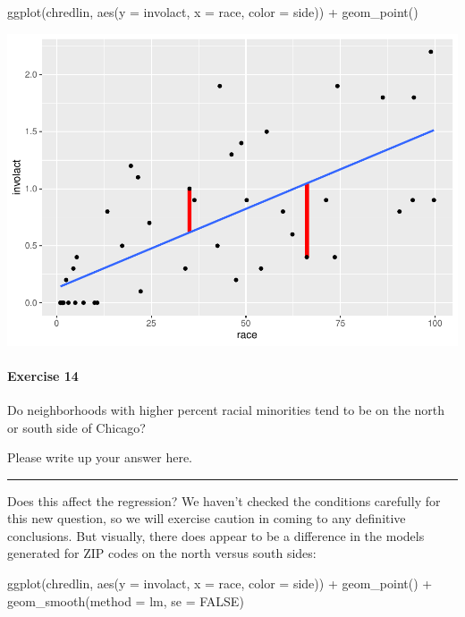 \documentclass[
]{book}
\newenvironment{Shaded}{\begin{snugshade}}{\end{snugshade}}
\newcommand{\AttributeTok}[1]{\textcolor[rgb]{0.77,0.63,0.00}{#1}}
\newcommand{\ConstantTok}[1]{\textcolor[rgb]{0.00,0.00,0.00}{#1}}
\newcommand{\FunctionTok}[1]{\textcolor[rgb]{0.00,0.00,0.00}{#1}}
\newcommand{\NormalTok}[1]{#1}
\newcommand{\SpecialCharTok}[1]{\textcolor[rgb]{0.00,0.00,0.00}{#1}}
\begin{document}
\begin{Shaded}
\begin{Highlighting}[]
\FunctionTok{ggplot}\NormalTok{(chredlin, }\FunctionTok{aes}\NormalTok{(}\AttributeTok{y =}\NormalTok{ involact, }\AttributeTok{x =}\NormalTok{ race, }\AttributeTok{color =}\NormalTok{ side)) }\SpecialCharTok{+}
    \FunctionTok{geom\_point}\NormalTok{()}
\end{Highlighting}
\end{Shaded}

\includegraphics{intro_stats_files/figure-latex/unnamed-chunk-196-1.pdf}

\hypertarget{exercise-14}{%
\paragraph*{Exercise 14}\label{exercise-14}}

Do neighborhoods with higher percent racial minorities tend to be on the north or south side of Chicago?

Please write up your answer here.

\begin{center}\rule{0.5\linewidth}{0.5pt}\end{center}

Does this affect the regression? We haven't checked the conditions carefully for this new question, so we will exercise caution in coming to any definitive conclusions. But visually, there does appear to be a difference in the models generated for ZIP codes on the north versus south sides:

\begin{Shaded}
\begin{Highlighting}[]
\FunctionTok{ggplot}\NormalTok{(chredlin, }\FunctionTok{aes}\NormalTok{(}\AttributeTok{y =}\NormalTok{ involact, }\AttributeTok{x =}\NormalTok{ race, }\AttributeTok{color =}\NormalTok{ side)) }\SpecialCharTok{+}
    \FunctionTok{geom\_point}\NormalTok{() }\SpecialCharTok{+}
    \FunctionTok{geom\_smooth}\NormalTok{(}\AttributeTok{method =}\NormalTok{ lm, }\AttributeTok{se =} \ConstantTok{FALSE}\NormalTok{)}
\end{Highlighting}
\end{Shaded}
\end{document}
